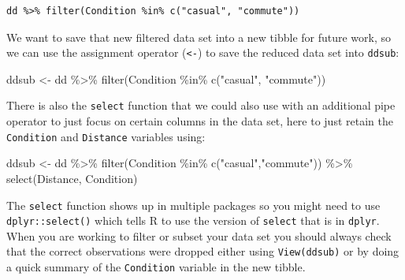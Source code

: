 \documentclass[
]{book}
\newenvironment{Shaded}{\begin{snugshade}}{\end{snugshade}}
\newcommand{\FunctionTok}[1]{\textcolor[rgb]{0.00,0.00,0.00}{#1}}
\newcommand{\NormalTok}[1]{#1}
\newcommand{\OtherTok}[1]{\textcolor[rgb]{0.56,0.35,0.01}{#1}}
\newcommand{\SpecialCharTok}[1]{\textcolor[rgb]{0.00,0.00,0.00}{#1}}
\newcommand{\StringTok}[1]{\textcolor[rgb]{0.31,0.60,0.02}{#1}}
\begin{document}
\begin{verbatim}
dd %>% filter(Condition %in% c("casual", "commute"))
\end{verbatim}

We want to save that new filtered data set into a new tibble for future work, so we can use the assignment operator (\texttt{\textless{}-}) to save the reduced data set into \texttt{ddsub}:

\begin{Shaded}
\begin{Highlighting}[]
\NormalTok{ddsub }\OtherTok{\textless{}{-}}\NormalTok{ dd }\SpecialCharTok{\%\textgreater{}\%} \FunctionTok{filter}\NormalTok{(Condition }\SpecialCharTok{\%in\%} \FunctionTok{c}\NormalTok{(}\StringTok{"casual"}\NormalTok{, }\StringTok{"commute"}\NormalTok{))}
\end{Highlighting}
\end{Shaded}

There is also the \texttt{select} function that we could also use with an additional pipe operator to just focus on certain columns in the data set, here to just retain the \texttt{Condition} and \texttt{Distance} variables using: 

\begin{Shaded}
\begin{Highlighting}[]
\NormalTok{ddsub }\OtherTok{\textless{}{-}}\NormalTok{ dd }\SpecialCharTok{\%\textgreater{}\%} 
  \FunctionTok{filter}\NormalTok{(Condition }\SpecialCharTok{\%in\%} \FunctionTok{c}\NormalTok{(}\StringTok{"casual"}\NormalTok{,}\StringTok{"commute"}\NormalTok{)) }\SpecialCharTok{\%\textgreater{}\%}
  \FunctionTok{select}\NormalTok{(Distance, Condition)}
\end{Highlighting}
\end{Shaded}

The \texttt{select} function shows up in multiple packages so you might need to use \texttt{dplyr::select()} which tells R to use the version of \texttt{select} that is in \texttt{dplyr}. When you are working to filter or subset your data set you should always check that the correct observations were dropped
either using \texttt{View(ddsub)} or by doing a quick summary of the
\texttt{Condition} variable in the new tibble.

\begin{Shaded}
\end{Shaded}
\end{document}
